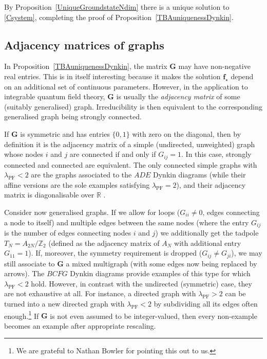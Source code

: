 \documentclass[12pt]{article}
\theoremstyle{plain}
\theoremstyle{definition}
\numberwithin{equation}{section}
\numberwithin{theorem}{section}
\renewcommand{\vec}[1]{\mathbf{#1}}
\begin{document}
By Proposition~\ref{UniqueGroundstateNdim} there is a unique solution to \eqref{Csystem}, completing the proof of Proposition~\ref{TBAuniquenessDynkin}.


\subsection{Adjacency matrices of graphs}\label{G-is-graph-section}

In Proposition~\ref{TBAuniquenessDynkin}, the matrix $\vec{G}$ may have non-negative real entries. This is in itself interesting because it makes the solution
	$\vec{f}_\star$
depend on an additional set of continuous parameters.
However, in the application to integrable quantum field theory, $\vec{G}$ is usually the \textsl{adjacency matrix} of some (suitably generalised) graph.
Irreducibility is then equivalent to the corresponding generalised graph being strongly connected.

If $\vec{G}$ is symmetric and has entries $\lbrace 0,1\rbrace$ with zero on the diagonal, then by definition it is the adjacency matrix of a simple (undirected, unweighted) graph whose nodes $i$ and $j$ are connected if and only if $G_{ij}=1$. 
In this case, strongly connected and connected are equivalent. 
The only connected simple graphs with $\lambda_{\mathrm{PF}}<2$ are the graphs associated to the $ADE$ Dynkin diagrams
(while their affine versions are the sole examples satisfying $\lambda_{\mathrm{PF}}=2$), and their adjacency matrix is diagonalisable over $\mathbb{R}$ \cite[Thm.\,3.1.3]{BrouwerHaemers}.

Consider now generalised graphs. 
If we allow for loops ($G_{ii}\neq 0$, edges connecting a node to itself) and 
multiple edges between the same nodes (where the entry $G_{ij}$ is the number of edges connecting nodes $i$ and $j$)
we additionally get the tadpole
$T_N=A_{2N}/\mathbb{Z}_2$ (defined as the adjacency matrix of $A_N$ with additional entry $G_{11}=1$).
If, moreover, the symmetry requirement is dropped ($G_{ij}\neq G_{ji}$), we may still associate to $\vec{G}$ a mixed multigraph (with some edges now being replaced by arrows). The $BCFG$ Dynkin diagrams provide examples of this type for which $\lambda_{\mathrm{PF}}<2$ hold. However, in contrast with the undirected (symmetric) case, they are not exhaustive at all. For instance, a directed graph with $\lambda_{\mathrm{PF}}>2$ can be turned into a new directed graph with $\lambda_{\mathrm{PF}}<2$ by
subdividing all its edges often enough.\footnote{We are grateful to Nathan Bowler 
for pointing this out to us.} If $\vec{G}$ is not even assumed to be integer-valued, then every non-example becomes an example after appropriate rescaling.
\end{document}

